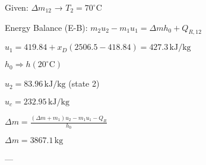 Given: \( \Delta m_{12} \) → \( T_2 = 70^\circ \text{C} \)  

Energy Balance (E-B):  
\( m_2 u_2 - m_1 u_1 = \Delta m h_0 + Q_{R,12} \)  

\( u_1 = 419.84 + x_D (2506.5 - 418.84) = 427.3 \, \text{kJ/kg} \)  

\( h_0 \Rightarrow h(20^\circ \text{C}) \)  

\( u_2 = 83.96 \, \text{kJ/kg} \) (state 2)  

\( u_c = 232.95 \, \text{kJ/kg} \)  

\( \Delta m = \frac{(\Delta m + m_1) u_2 - m_1 u_1 - Q_R}{h_0} \)  

\( \Delta m = 3867.1 \, \text{kg} \)  

---